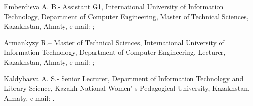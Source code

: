 \begin{authorinfo}
Emberdieva A. B.- Assistant G1, International University of Information
Technology, Department of Computer Engineering, Master of Technical
Sciences, Kazakhstan, Almaty, e-mail:
\href{mailto:a.yemberdiyeva@iitu.edu.kz}{};

Armankyzy R.-- Master of Technical Sciences, International University of
Information Technology, Department of Computer Engineering, Lecturer,
Kazakhstan, Almaty, e-mail:
\href{mailto:armankyzyrenata@gmail.com}{};

Kaldybaeva A. S.- Senior Lecturer, Department of Information Technology
and Library Science, Kazakh National Women' s Pedagogical
University, Kazakhstan, Almaty, e-mail:
\href{mailto:aizhan.seisebek@gmail.com}{}.
\end{authorinfo}
